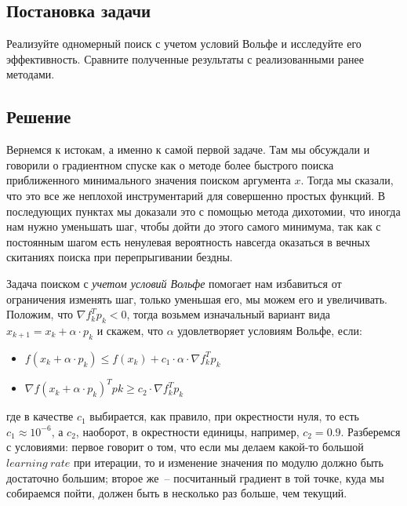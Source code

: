 \documentclass[12pt, a4paper, oneside, final]{article}
\begin{document}
	\subsection*{Постановка задачи}
	Реализуйте одномерный поиск с учетом условий Вольфе и исследуйте его эффективность. Сравните полученные результаты с реализованными ранее методами.
	\subsection*{Решение}
	Вернемся к истокам, а именно к самой первой задаче. Там мы обсуждали и говорили о градиентном спуске как о методе более быстрого поиска приближенного минимального значения поиском аргумента $x$. Тогда мы сказали, что это все же неплохой инструментарий для совершенно простых функций. В последующих пунктах мы доказали это с помощью метода дихотомии, что иногда нам нужно уменьшать шаг, чтобы дойти до этого самого минимума, так как с постоянным шагом есть ненулевая вероятность навсегда оказаться в вечных скитаниях поиска при перепрыгивании бездны.

	Задача поиском с \textit{учетом условий Вольфе} помогает нам избавиться от ограничения изменять шаг, только уменьшая его, мы можем его и увеличивать. Положим, что $\nabla{f^{T}_{k}p_{k}} < 0$, тогда возьмем изначальный вариант вида $x_{k + 1} = x_{k} + \alpha \cdot p_{k}$ и скажем, что $\alpha$ удовлетворяет условиям Вольфе, если:
	\begin{itemize}
		\item $f(x_{k} + \alpha \cdot p_{k}) \leqslant f(x_{k}) + c_{1} \cdot \alpha \cdot \nabla{f^{T}_{k}p_{k}}$
		\item $\nabla{f(x_{k} + \alpha \cdot p_{k})^{T}p{k}} \geqslant c_{2} \cdot \nabla{f^{T}_{k}p_{k}}$
	\end{itemize}
	где в качестве $c_{1}$ выбирается, как правило, при окрестности нуля, то есть $c_{1} \approx 10^{-6}$, а $c_{2}$, наоборот, в окрестности единицы, например, $c_{2} = 0.9$. Разберемся с условиями: первое говорит о том, что если мы делаем какой-то большой $learning~rate$ при итерации, то и изменение значения по модулю должно быть достаточно большим; второе же~-- посчитанный градиент в той точке, куда мы собираемся пойти, должен быть в несколько раз больше, чем текущий.
\end{document}
